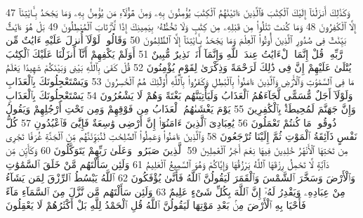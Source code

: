{\tiny\colorbox{cl_aya}{47}} وَكَذَٰلِكَ أَنزَلْنَآ إِلَيْكَ ٱلْكِتَٰبَ فَٱلَّذِينَ ءَاتَيْنَٰهُمُ ٱلْكِتَٰبَ يُؤْمِنُونَ بِهِۦ وَمِنْ هَٰٓؤُلَآءِ مَن يُؤْمِنُ بِهِۦ وَمَا يَجْحَدُ بِـَٔايَٰتِنَآ إِلَّا ٱلْكَٰفِرُونَ
{\tiny\colorbox{cl_aya}{48}} وَمَا كُنتَ تَتْلُوا۟ مِن قَبْلِهِۦ مِن كِتَٰبٍ وَلَا تَخُطُّهُۥ بِيَمِينِكَ إِذًا لَّٱرْتَابَ ٱلْمُبْطِلُونَ
{\tiny\colorbox{cl_aya}{49}} بَلْ هُوَ ءَايَٰتٌۢ بَيِّنَٰتٌ فِى صُدُورِ ٱلَّذِينَ أُوتُوا۟ ٱلْعِلْمَ وَمَا يَجْحَدُ بِـَٔايَٰتِنَآ إِلَّا ٱلظَّٰلِمُونَ
{\tiny\colorbox{cl_aya}{50}} وَقَالُوا۟ لَوْلَآ أُنزِلَ عَلَيْهِ ءَايَٰتٌ مِّن رَّبِّهِۦ قُلْ إِنَّمَا ٱلْءَايَٰتُ عِندَ ٱللَّهِ وَإِنَّمَآ أَنَا۠ نَذِيرٌ مُّبِينٌ
{\tiny\colorbox{cl_aya}{51}} أَوَلَمْ يَكْفِهِمْ أَنَّآ أَنزَلْنَا عَلَيْكَ ٱلْكِتَٰبَ يُتْلَىٰ عَلَيْهِمْ إِنَّ فِى ذَٰلِكَ لَرَحْمَةً وَذِكْرَىٰ لِقَوْمٍ يُؤْمِنُونَ
{\tiny\colorbox{cl_aya}{52}} قُلْ كَفَىٰ بِٱللَّهِ بَيْنِى وَبَيْنَكُمْ شَهِيدًا يَعْلَمُ مَا فِى ٱلسَّمَٰوَٰتِ وَٱلْأَرْضِ وَٱلَّذِينَ ءَامَنُوا۟ بِٱلْبَٰطِلِ وَكَفَرُوا۟ بِٱللَّهِ أُو۟لَٰٓئِكَ هُمُ ٱلْخَٰسِرُونَ
{\tiny\colorbox{cl_aya}{53}} وَيَسْتَعْجِلُونَكَ بِٱلْعَذَابِ وَلَوْلَآ أَجَلٌ مُّسَمًّى لَّجَآءَهُمُ ٱلْعَذَابُ وَلَيَأْتِيَنَّهُم بَغْتَةً وَهُمْ لَا يَشْعُرُونَ
{\tiny\colorbox{cl_aya}{54}} يَسْتَعْجِلُونَكَ بِٱلْعَذَابِ وَإِنَّ جَهَنَّمَ لَمُحِيطَةٌۢ بِٱلْكَٰفِرِينَ
{\tiny\colorbox{cl_aya}{55}} يَوْمَ يَغْشَىٰهُمُ ٱلْعَذَابُ مِن فَوْقِهِمْ وَمِن تَحْتِ أَرْجُلِهِمْ وَيَقُولُ ذُوقُوا۟ مَا كُنتُمْ تَعْمَلُونَ
{\tiny\colorbox{cl_aya}{56}} يَٰعِبَادِىَ ٱلَّذِينَ ءَامَنُوٓا۟ إِنَّ أَرْضِى وَٰسِعَةٌ فَإِيَّٰىَ فَٱعْبُدُونِ
{\tiny\colorbox{cl_aya}{57}} كُلُّ نَفْسٍ ذَآئِقَةُ ٱلْمَوْتِ ثُمَّ إِلَيْنَا تُرْجَعُونَ
{\tiny\colorbox{cl_aya}{58}} وَٱلَّذِينَ ءَامَنُوا۟ وَعَمِلُوا۟ ٱلصَّٰلِحَٰتِ لَنُبَوِّئَنَّهُم مِّنَ ٱلْجَنَّةِ غُرَفًا تَجْرِى مِن تَحْتِهَا ٱلْأَنْهَٰرُ خَٰلِدِينَ فِيهَا نِعْمَ أَجْرُ ٱلْعَٰمِلِينَ
{\tiny\colorbox{cl_aya}{59}} ٱلَّذِينَ صَبَرُوا۟ وَعَلَىٰ رَبِّهِمْ يَتَوَكَّلُونَ
{\tiny\colorbox{cl_aya}{60}} وَكَأَيِّن مِّن دَآبَّةٍ لَّا تَحْمِلُ رِزْقَهَا ٱللَّهُ يَرْزُقُهَا وَإِيَّاكُمْ وَهُوَ ٱلسَّمِيعُ ٱلْعَلِيمُ
{\tiny\colorbox{cl_aya}{61}} وَلَئِن سَأَلْتَهُم مَّنْ خَلَقَ ٱلسَّمَٰوَٰتِ وَٱلْأَرْضَ وَسَخَّرَ ٱلشَّمْسَ وَٱلْقَمَرَ لَيَقُولُنَّ ٱللَّهُ فَأَنَّىٰ يُؤْفَكُونَ
{\tiny\colorbox{cl_aya}{62}} ٱللَّهُ يَبْسُطُ ٱلرِّزْقَ لِمَن يَشَآءُ مِنْ عِبَادِهِۦ وَيَقْدِرُ لَهُۥٓ إِنَّ ٱللَّهَ بِكُلِّ شَىْءٍ عَلِيمٌ
{\tiny\colorbox{cl_aya}{63}} وَلَئِن سَأَلْتَهُم مَّن نَّزَّلَ مِنَ ٱلسَّمَآءِ مَآءً فَأَحْيَا بِهِ ٱلْأَرْضَ مِنۢ بَعْدِ مَوْتِهَا لَيَقُولُنَّ ٱللَّهُ قُلِ ٱلْحَمْدُ لِلَّهِ بَلْ أَكْثَرُهُمْ لَا يَعْقِلُونَ

